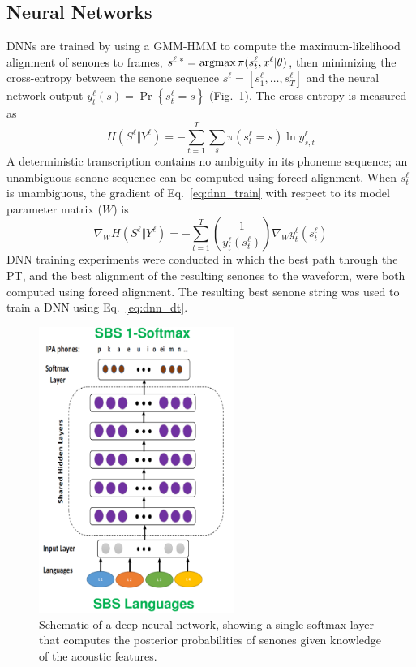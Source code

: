 \subsection{Neural Networks}

DNNs are trained by using a GMM-HMM to compute the maximum-likelihood
alignment of senones to frames, $s^{\ell,*}=\operatorname*{argmax}
\pi(s_t^\ell,x^\ell|\theta)$, then minimizing the cross-entropy between
the senone sequence $s^\ell=[s_1^\ell,\ldots,s_T^\ell]$ and the neural
network output $y_{t}^\ell(s)=\Pr\left\{s_t^\ell=s\right\}$
(Fig.~\ref{fig:das1}).  The cross entropy is measured as
\begin{equation}
  H(S^\ell\Vert Y^\ell)=-\sum_{t=1}^T \sum_{s} \pi(s_t^\ell=s) \ln y_{s,t}^\ell
  \label{eq:dnn_train}
\end{equation}
A deterministic transcription contains no ambiguity in its phoneme
sequence; an unambiguous senone sequence can be computed using forced
alignment.  When $s_t^\ell$ is unambiguous, the gradient of
Eq.~\ref{eq:dnn_train} with respect to its model parameter matrix
($W$) is
\begin{equation}
  \nabla_W H(S^\ell\Vert Y^\ell)=-\sum_{t=1}^T
  \left(\frac{1}{y_t^\ell(s_t^\ell)}\right)\nabla_W y_t^\ell(s_t^\ell)
  \label{eq:dnn_dt}
\end{equation}
DNN training experiments were conducted in which the best path through
the PT, and the best alignment of the resulting senones to the
waveform, were both computed using forced alignment.  The resulting
best senone string was used to train a DNN using Eq.~\ref{eq:dnn_dt}.

\begin{figure}
  \centerline{\includegraphics[width=2.5in]{../figs/das1.png}}
  \caption{Schematic of a deep neural network, showing a single
    softmax layer that computes the posterior probabilities of senones
    given knowledge of the acoustic features.}
  \label{fig:das1}
\end{figure}

